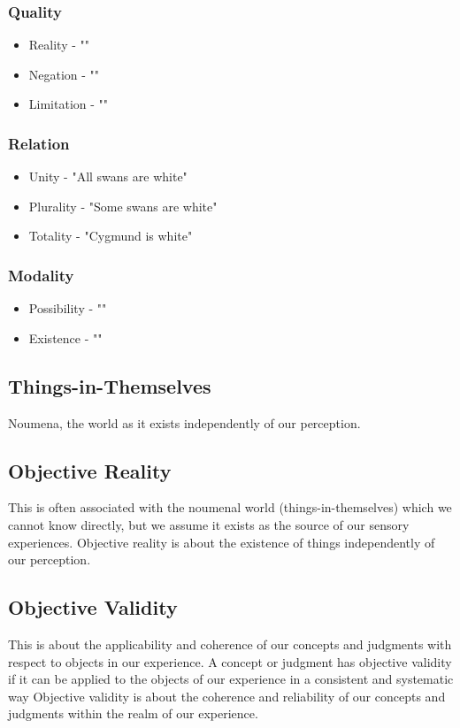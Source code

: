 \documentclass[a4paper]{article}
\begin{document}
\subsubsection{Quality}
\begin{itemize}
    \item Reality - ""
    \item Negation - ""
    \item Limitation - ""
\end{itemize}

\subsubsection{Relation}
\begin{itemize}
    \item Unity - "All swans are white"
    \item Plurality - "Some swans are white"
    \item Totality - "Cygmund is white"
\end{itemize}

\subsubsection{Modality}
\begin{itemize}
    \item Possibility - ""
    \item Existence - ""
\end{itemize}

\subsection{}

\subsection{Things-in-Themselves}
Noumena, the world as it exists independently of our perception.

\subsection{Objective Reality}
This is often associated with the noumenal world (things-in-themselves) which we cannot know directly, but we assume it exists as the source of our sensory experiences.
Objective reality is about the existence of things independently of our perception.

\subsection{Objective Validity}
This is about the applicability and coherence of our concepts and judgments with respect to objects in our experience.
A concept or judgment has objective validity if it can be applied to the objects of our experience in a consistent and systematic way
Objective validity is about the coherence and reliability of our concepts and judgments within the realm of our experience.
\end{document}
